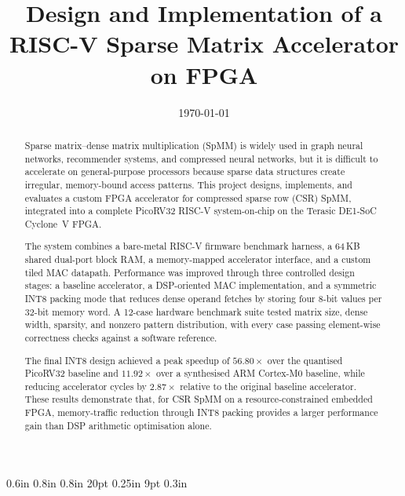 \documentclass[oneside]{ecsproject}    %
\newcommand{\setbodymargins}{
\setmarginsrb           {1.2in}  %
                        {0.6in}  %
                        {0.8in}  %
                        {0.8in}  %
                        {20pt}   %
                        {0.25in} %
                        {9pt}    %
                        {0.3in}  %
}
\begin{document}
\frontmatter
\title      {Design and Implementation of a RISC-V Sparse Matrix Accelerator on FPGA}
\addresses  {\groupname\\\deptname\\\univname}
\date       {\today}
\subject    {}
\keywords   {}
\maketitle
\setbodymargins

\begin{abstract}
Sparse matrix--dense matrix multiplication (SpMM) is widely used in
graph neural networks, recommender systems, and compressed neural
networks, but it is difficult to accelerate on general-purpose
processors because sparse data structures create irregular,
memory-bound access patterns. This project designs, implements, and
evaluates a custom FPGA accelerator for compressed sparse row (CSR)
SpMM, integrated into a complete PicoRV32 RISC-V system-on-chip on the
Terasic DE1-SoC Cyclone~V FPGA.

The system combines a bare-metal RISC-V firmware benchmark harness, a
64\,KB shared dual-port block RAM, a memory-mapped accelerator
interface, and a custom tiled MAC datapath. Performance was improved
through three controlled design stages: a baseline accelerator, a
DSP-oriented MAC implementation, and a symmetric INT8 packing mode
that reduces dense operand fetches by storing four 8-bit values per
32-bit memory word. A 12-case hardware benchmark suite tested matrix
size, dense width, sparsity, and nonzero pattern distribution, with every case
passing element-wise correctness checks against a software reference.

The final INT8 design achieved a peak speedup of $56.80\times$ over
the quantised PicoRV32 baseline and $11.92\times$ over a synthesised
ARM Cortex-M0 baseline, while reducing accelerator cycles by
$2.87\times$ relative to the original baseline accelerator. These
results demonstrate that, for CSR SpMM on a resource-constrained
embedded FPGA, memory-traffic reduction through INT8 packing provides
a larger performance gain than DSP arithmetic optimisation alone.
\end{abstract}



\end{document}
